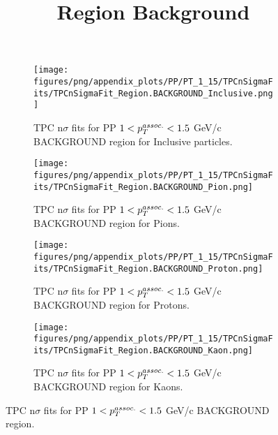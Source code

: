             \begin{figure}[H]
                \title{Region Background}
                \begin{subfigure}[b]{0.5\textwidth}
                    \centering
                    \texttt{[image: figures/png/appendix\_plots/PP/PT\_1\_15/TPCnSigmaFits/TPCnSigmaFit\_Region.BACKGROUND\_Inclusive.png]}
                    \caption{TPC n$\sigma$ fits for PP $1 < \pTassoc < 1.5$ GeV/c BACKGROUND region for Inclusive particles.}
                    \label{fig:appendix_PP_$1 < \pTassoc < 1.5$ GeV/c_BACKGROUND_Inclusive}
                \end{subfigure}
                \begin{subfigure}[b]{0.5\textwidth}
                    \centering
                    \texttt{[image: figures/png/appendix\_plots/PP/PT\_1\_15/TPCnSigmaFits/TPCnSigmaFit\_Region.BACKGROUND\_Pion.png]}
                    \caption{TPC n$\sigma$ fits for PP $1 < \pTassoc < 1.5$ GeV/c BACKGROUND region for Pions.}
                    \label{fig:appendix_PP_$1 < \pTassoc < 1.5$ GeV/c_BACKGROUND_Pion}
                \end{subfigure}
                \begin{subfigure}[b]{0.5\textwidth}
                    \centering
                    \texttt{[image: figures/png/appendix\_plots/PP/PT\_1\_15/TPCnSigmaFits/TPCnSigmaFit\_Region.BACKGROUND\_Proton.png]}
                    \caption{TPC n$\sigma$ fits for PP $1 < \pTassoc < 1.5$ GeV/c BACKGROUND region for Protons.}
                    \label{fig:appendix_PP_$1 < \pTassoc < 1.5$ GeV/c_BACKGROUND_Proton}
                \end{subfigure}
                \begin{subfigure}[b]{0.5\textwidth}
                    \centering
                    \texttt{[image: figures/png/appendix\_plots/PP/PT\_1\_15/TPCnSigmaFits/TPCnSigmaFit\_Region.BACKGROUND\_Kaon.png]}
                    \caption{TPC n$\sigma$ fits for PP $1 < \pTassoc < 1.5$ GeV/c BACKGROUND region for Kaons.}
                    \label{fig:appendix_PP_$1 < \pTassoc < 1.5$ GeV/c_BACKGROUND_Kaon}
                \end{subfigure}
                \caption{TPC n$\sigma$ fits for PP $1 < \pTassoc < 1.5$ GeV/c BACKGROUND region.}
                \label{fig:appendix_PP_$1 < \pTassoc < 1.5$ GeV/c_BACKGROUND}
            \end{figure}
            \clearpage
            
